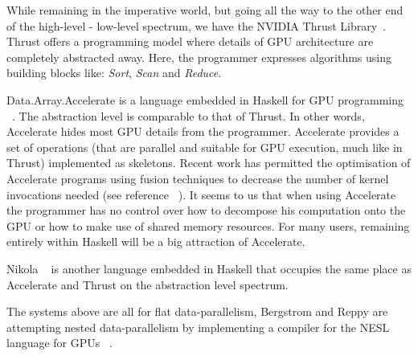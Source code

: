 
While remaining in the imperative world, but going all the way to the 
other end of the high-level - low-level spectrum, we have the NVIDIA
Thrust Library~.
Thrust offers a programming model where details of GPU architecture are 
completely abstracted away. Here, the programmer expresses algorithms 
using building blocks like: \emph{Sort}, \emph{Scan} and \emph{Reduce}.  

Data.Array.Accelerate is a language embedded in Haskell for GPU programming 
~. The abstraction level is comparable to that of Thrust. In 
other words, Accelerate hides most GPU details from the programmer. Accelerate 
provides a set of operations (that are parallel and suitable for GPU execution, 
much like in Thrust) implemented as skeletons. Recent work has permitted
the optimisation of Accelerate programs using fusion techniques to decrease
the number of kernel invocations needed (see reference ~).
It seems to us that when using Accelerate the programmer has no control over how to 
decompose his computation onto the GPU or how to make use of shared memory 
resources. For many users, remaining entirely within Haskell will be
a big attraction of Accelerate.     

Nikola ~ is another language embedded in Haskell that occupies the 
same place as Accelerate and Thrust on the abstraction level spectrum. 

The systems above are all for flat data-parallelism, Bergstrom 
and Reppy are attempting nested data-parallelism by implementing a 
compiler for the NESL language for GPUs ~. 


